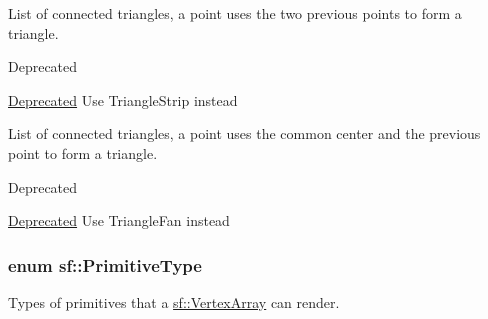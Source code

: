 \begin{Desc}
\begin{description}
\item[{\em 
\hypertarget{group__graphics_gga5ee56ac1339984909610713096283b1baf5ef0ffa5d13f9ea3e0eb18a2a8da7fb}{Triangles\-Strip}\label{group__graphics_gga5ee56ac1339984909610713096283b1baf5ef0ffa5d13f9ea3e0eb18a2a8da7fb}
}]List of connected triangles, a point uses the two previous points to form a triangle. \begin{DoxyRefDesc}{Deprecated}
\item[\hyperlink{deprecated__deprecated000003}{Deprecated}]Use Triangle\-Strip instead \end{DoxyRefDesc}
\item[{\em 
\hypertarget{group__graphics_gga5ee56ac1339984909610713096283b1ba698ecd8ec938b4132412b8da44a1a6be}{Triangles\-Fan}\label{group__graphics_gga5ee56ac1339984909610713096283b1ba698ecd8ec938b4132412b8da44a1a6be}
}]List of connected triangles, a point uses the common center and the previous point to form a triangle. \begin{DoxyRefDesc}{Deprecated}
\item[\hyperlink{deprecated__deprecated000004}{Deprecated}]Use Triangle\-Fan instead \end{DoxyRefDesc}
\end{description}
\end{Desc}
\hypertarget{group__graphics_ga5ee56ac1339984909610713096283b1b}{
\subsubsection[{Primitive\-Type}]{\setlength{\rightskip}{0pt plus 5cm}enum {\bf sf\-::\-Primitive\-Type}}}\label{group__graphics_ga5ee56ac1339984909610713096283b1b}


Types of primitives that a \hyperlink{classsf_1_1_vertex_array}{sf\-::\-Vertex\-Array} can render. 

